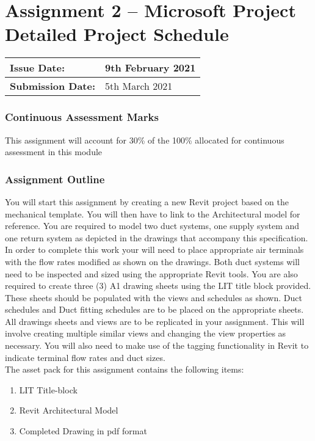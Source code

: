 
	
\part*{Assignment 2 – Microsoft Project Detailed Project Schedule}

\begin{tabularx}{\textwidth}{ |X|X| }
	\hline
	\textbf{Issue Date:} & 9th February 2021 \\
	\hline 
	\textbf{Submission Date:}  & 5th March 2021  \\
	\hline
\end{tabularx}


\section*{Continuous Assessment Marks}
This assignment will account for 30\% of the 100\% allocated for continuous assessment in this module

\section*{Assignment Outline}
You will start this assignment by creating a new Revit project based on the mechanical template.  You will then have to link to the Architectural model for reference.  You are required to model two duct systems, one supply system and one return system as depicted in the drawings that accompany this specification. In order to complete this work your will need to place appropriate air terminals with the flow rates modified as shown on the drawings. Both duct systems will need to be inspected and sized using the appropriate Revit tools. You are also required to create three (3) A1 drawing sheets using the LIT title block provided. These sheets should be populated with the views and schedules as shown.  Duct schedules and Duct fitting schedules are to be placed on the appropriate sheets. All drawings sheets and views are to be replicated in your assignment. This will involve creating multiple similar views and changing the view properties as necessary. You will also need to make use of the tagging functionality in Revit to indicate terminal flow rates and duct sizes.\\


The asset pack for this assignment contains the following items:
\begin{enumerate}
	\item LIT Title-block
	\item Revit Architectural Model
	\item Completed Drawing in pdf format
\end{enumerate}


